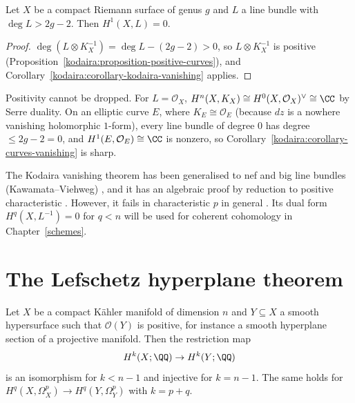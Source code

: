 \begin{corollary}\label{kodaira:corollary-curves-vanishing}
Let $X$ be a compact Riemann surface of genus $g$ and $L$ a line bundle with $\deg L > 2g - 2$. Then $H^1(X, L) = 0$.
\end{corollary}

\begin{proof}
$\deg(L \otimes K_X^{-1}) = \deg L - (2g - 2) > 0$, so $L \otimes K_X^{-1}$ is positive (Proposition~\ref{kodaira:proposition-positive-curves}), and
Corollary~\ref{kodaira:corollary-kodaira-vanishing} applies.
\end{proof}

\begin{counterexample}\label{kodaira:counterexample-trivial-bundle}
Positivity cannot be dropped. For $L = \mathcal{O}_X$, $H^n(X, K_X) \cong H^0(X, \mathcal{O}_X)^\vee \cong \CC$ by Serre duality. On an
elliptic curve $E$, where $K_E \cong \mathcal{O}_E$ (because $dz$ is a nowhere vanishing holomorphic $1$-form), every line bundle of degree $0$
has degree $\leq 2g - 2 = 0$, and $H^1(E, \mathcal{O}_E) \cong \CC$ is nonzero, so Corollary~\ref{kodaira:corollary-curves-vanishing} is sharp.
\end{counterexample}

\begin{remark}\label{kodaira:remark-vanishing-generalisations}
The Kodaira vanishing theorem has been generalised to nef and big line bundles (Kawamata--Viehweg) \cite[Chapter 4]{lazarsfeld-positivity-1},
and it has an algebraic proof by reduction to positive characteristic \cite{deligne-illusie}. However, it fails in characteristic $p$ in
general \cite{raynaud-1978}. Its dual form
$H^q(X, L^{-1}) = 0$ for $q < n$ will be used for coherent cohomology in Chapter~\ref{schemes}.
\end{remark}

\section{The Lefschetz hyperplane theorem}\label{kodaira:section-lefschetz-hyperplane}

\begin{theorem}\label{kodaira:theorem-lefschetz-hyperplane}
Let $X$ be a compact K\"ahler manifold of dimension $n$ and $Y \subseteq X$ a smooth hypersurface such that $\mathcal{O}(Y)$ is positive, for
instance a smooth hyperplane section of a projective manifold. Then the restriction map
\[
H^k(X; \QQ) \to H^k(Y; \QQ)
\]
is an isomorphism for $k < n - 1$ and injective for $k = n - 1$. The same holds for $H^q(X, \Omega^p_X) \to H^q(Y, \Omega^p_Y)$ with
$k = p + q$.
\end{theorem}

